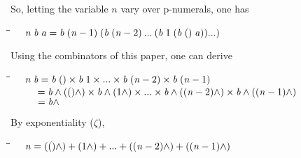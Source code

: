 \documentclass{article}
\newlength{\lwidth}\setlength{\lwidth}{4.5cm}
\newlength{\cwidth}\setlength{\cwidth}{8mm} %
\newcommand{\Varid}[1]{\mathit{#1}}
\begin{document}
So, letting the variable \ensuremath{\Varid{n}} vary over p-numerals, one has
\begin{tabbing}
\qquad\=\hspace{\lwidth}\=\hspace{\cwidth}\=\+\kill
${\hskip0.50em\relax\phantom{\lambda \mbox{}}\Varid{n}\;\Varid{b}\;\Varid{a}\mathrel{=}\Varid{b}\;(\Varid{n}\mathbin{-}\mathrm{1})\;(\Varid{b}\;(\Varid{n}\mathbin{-}\mathrm{2})\mathbin{...}(\Varid{b}\;\mathrm{1}\;(\Varid{b}\;(\!\mathop{{}^{{}^{\cdot}}}\!)\;\Varid{a}))\mathbin{...})}$
\end{tabbing}
Using the combinators of this paper, one can derive
\begin{tabbing}
\qquad\=\hspace{\lwidth}\=\hspace{\cwidth}\=\+\kill
${\hskip0.50em\relax\phantom{\lambda \mbox{}}\Varid{n}\;\Varid{b}\mathrel{=}\Varid{b}\;(\!\mathop{{}^{{}^{\cdot}}}\!)\times\Varid{b}\;\mathrm{1}\times\mathbin{...}\times\Varid{b}\;(\Varid{n}\mathbin{-}\mathrm{2})\times\Varid{b}\;(\Varid{n}\mathbin{-}\mathrm{1})}$\\
${\hskip0.50em\relax\phantom{\lambda \mbox{}}\phantom{\Varid{n}\;\Varid{b}\mbox{}}\mathrel{=}\Varid{b}\wedge((\!\mathop{{}^{{}^{\cdot}}}\!)\wedge)\times\Varid{b}\wedge(\mathrm{1}\wedge)\times\mathbin{...}\times\Varid{b}\wedge((\Varid{n}\mathbin{-}\mathrm{2})\wedge)\times\Varid{b}\wedge((\Varid{n}\mathbin{-}\mathrm{1})\wedge)}$\\
${\hskip0.50em\relax\phantom{\lambda \mbox{}}\phantom{\Varid{n}\;\Varid{b}\mbox{}}\mathrel{=}\Varid{b}\wedge}$
\end{tabbing}
By exponentiality ($\zeta$), 
\begin{tabbing}
\qquad\=\hspace{\lwidth}\=\hspace{\cwidth}\=\+\kill
${\hskip0.50em\relax\phantom{\lambda \mbox{}}\Varid{n}\mathrel{=}((\!\mathop{{}^{{}^{\cdot}}}\!)\wedge)\mathbin{+}(\mathrm{1}\wedge)\mathbin{+}\mathbin{...}\mathbin{+}((\Varid{n}\mathbin{-}\mathrm{2})\wedge)\mathbin{+}((\Varid{n}\mathbin{-}\mathrm{1})\wedge)}$
\end{tabbing}
\end{document}
